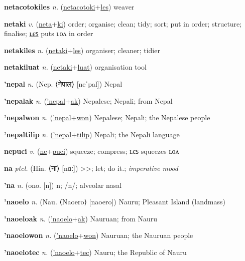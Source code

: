 \textbf{\hypertarget{netacotokiles}{netacotokiles}} \textit{n.} (\hyperlink{netacotoki}{netacotoki}+\allowbreak \hyperlink{les}{les})
weaver

\textbf{\hypertarget{netaki}{netaki}} \textit{v.} (\hyperlink{neta}{neta}+\allowbreak \hyperlink{ki}{ki})
order; organise; clean; tidy; sort; put in order; structure; finalise; \hyperlink{netakiles}{ʟєꜱ} puts ʟᴏᴧ in order

\textbf{\hypertarget{netakiles}{netakiles}} \textit{n.} (\hyperlink{netaki}{netaki}+\allowbreak \hyperlink{les}{les})
organiser; cleaner; tidier

\textbf{\hypertarget{netakiluat}{netakiluat}} \textit{n.} (\hyperlink{netaki}{netaki}+\allowbreak \hyperlink{luat}{luat})
organisation tool

\textbf{\hypertarget{'nepal}{'nepal}} \textit{n.} (Nep. ⟨{\devanagari{}नेपाल}⟩ [neˈpal])
Nepal

\textbf{\hypertarget{'nepalak}{'nepalak}} \textit{n.} (\hyperlink{'nepal}{'nepal}+\allowbreak \hyperlink{ak}{ak})
Nepalese; Nepali; from Nepal

\textbf{\hypertarget{'nepalwon}{'nepalwon}} \textit{n.} (\hyperlink{'nepal}{'nepal}+\allowbreak \hyperlink{won}{won})
Nepalese; Nepali; the Nepalese people

\textbf{\hypertarget{'nepaltilip}{'nepaltilip}} \textit{n.} (\hyperlink{'nepal}{'nepal}+\allowbreak \hyperlink{tilip}{tilip})
Nepali; the Nepali language

\textbf{\hypertarget{nepuci}{nepuci}} \textit{v.} (\hyperlink{ne}{ne}+\allowbreak \hyperlink{puci}{puci})
squeeze; compress; ʟєꜱ squeezes ʟᴏᴧ

\textbf{\hypertarget{na}{na}} \textit{ptcl.} (Hin. ⟨{\devanagari{}ना}⟩ [nɑː])
>>; let; do it.; \textit{imperative mood}

\textbf{\hypertarget{'na}{'na}} \textit{n.} (ono. [n])
n; /n/; alveolar nasal

\textbf{\hypertarget{'naoelo}{'naoelo}} \textit{n.} (Nau. ⟨Naoero⟩ [naoero])
Nauru; Pleasant Island (landmass)

\textbf{\hypertarget{'naoeloak}{'naoeloak}} \textit{n.} (\hyperlink{'naoelo}{'naoelo}+\allowbreak \hyperlink{ak}{ak})
Nauruan; from Nauru

\textbf{\hypertarget{'naoelowon}{'naoelowon}} \textit{n.} (\hyperlink{'naoelo}{'naoelo}+\allowbreak \hyperlink{won}{won})
Nauruan; the Nauruan people

\textbf{\hypertarget{'naoelotec}{'naoelotec}} \textit{n.} (\hyperlink{'naoelo}{'naoelo}+\allowbreak \hyperlink{tec}{tec})
Nauru; the Republic of Nauru

